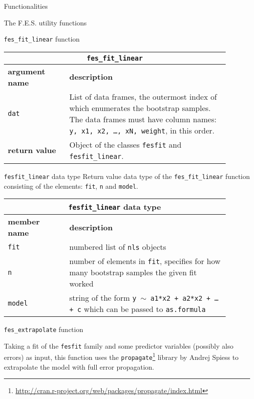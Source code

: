 \documentclass[10pt,a5paper]{article}
\begin{document}
\begin{section}{Functionalities}
\begin{subsection}{The F.E.S. utility functions}
\begin{subsubsection}{ {\tt fes\_fit\_linear} function }
{ \centering
\begin{tabular}{|p{0.25\linewidth}|p{0.65\linewidth}|}
\hline
\multicolumn{2}{|c|}{ {\tt fes\_fit\_linear} } \\
\hline \hline \textbf{argument name} & \textbf{description} \\ \hline
{\tt dat} & List of data frames, the outermost index of which enumerates the bootstrap samples.
The data frames must have column names: {\tt y, x1, x2, \ldots, xN, weight}, in this order. \\
\hline 
\textbf{return value} & Object of the classes {\tt fesfit} and {\tt fesfit\_linear}. \\
\hline
\end{tabular}
} %

\end{subsubsection}

\begin{subsubsection}{ {\tt fesfit\_linear} data type }
Return value data type of the {\tt fes\_fit\_linear} function consisting of the elements: {\tt fit}, {\tt n} and {\tt model}.

{ \centering
\begin{tabular}{|p{0.25\linewidth}|p{0.65\linewidth}|}
\hline
\multicolumn{2}{|c|}{ {\tt fesfit\_linear} data type } \\
\hline \hline \textbf{member name} & \textbf{description} \\ \hline
{\tt fit} & numbered list of {\tt nls} objects \\ 
{\tt n}  & number of elements in {\tt fit}, specifies for how many bootstrap samples the given fit worked \\ 
{\tt model} & string of the form {\tt y $\sim$ a1*x2 + a2*x2 + \ldots + c} which can be passed to {\tt as.formula} \\
\hline 
\end{tabular}
} %

\end{subsubsection}

\begin{subsubsection}{ {\tt fes\_extrapolate} function }

Taking a fit of the {\tt fesfit} family and some predictor variables (possibly also errors) as input, this function uses the {\tt propagate}\footnote{\url{http://cran.r-project.org/web/packages/propagate/index.html}} library by Andrej Spiess to extrapolate the model with full error propagation.


\end{subsubsection}
\end{subsection}
\end{section}
\end{document}
